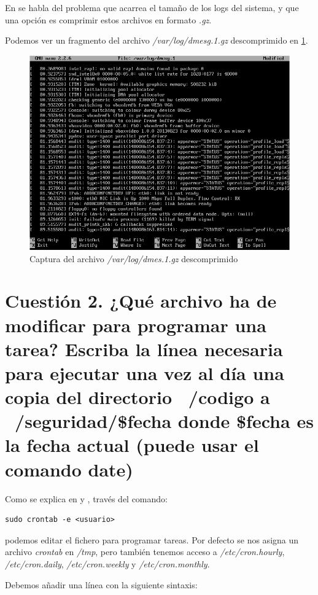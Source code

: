 En \cite{compression} se habla del problema que acarrea el tamaño de los logs del sistema, y que una opción es comprimir estos archivos en formato \textit{.gz}.

Podemos ver un fragmento del archivo \textit{/var/log/dmesg.1.gz} descomprimido en \ref{dmesg1}.

\begin{figure}[H]
	\centering
	\includegraphics[scale=0.45]{cuestion1-gznano.png}
	\caption{Captura del archivo \textit{/var/log/dmes.1.gz} descomprimido} \label{dmesg1}
\end{figure}

\section{Cuestión 2. ¿Qué archivo ha de modificar para programar una tarea? Escriba la línea necesaria para ejecutar una vez al día una copia del directorio ~/codigo a ~/seguridad/\$fecha donde \$fecha es la fecha actual (puede usar el comando date)}

Como se explica en \cite{cron} y \cite{cron2}, través del comando: \begin{verbatim}
sudo crontab -e <usuario>
\end{verbatim}

podemos editar el fichero para programar tareas.
Por defecto se nos asigna un archivo \textit{crontab} en \textit{/tmp}, pero también tenemos acceso a \textit{/etc/cron.hourly}, \textit{/etc/cron.daily}, \textit{/etc/cron.weekly} y \textit{/etc/cron.monthly}.

Debemos añadir una línea con la siguiente sintaxis:

